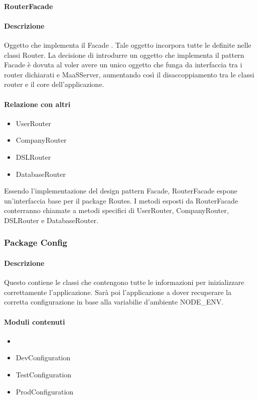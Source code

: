 \paragraph{RouterFacade}
\paragraph*{Descrizione}
Oggetto che implementa il Facade . Tale oggetto incorpora tutte le  definite nelle classi Router.
La decisione di introdurre un oggetto che implementa il pattern Facade è dovuta al voler avere un unico oggetto che funga da interfaccia tra i router dichiarati e MaaSServer, aumentando così il disaccoppiamento tra le classi router e il core dell'applicazione.  

\paragraph*{Relazione con altri }
\begin{itemize}
\item UserRouter
\item CompanyRouter
\item DSLRouter
\item DatabaseRouter
\end{itemize}
Essendo l'implementazione del design pattern Facade, RouterFacade espone un'interfaccia base per il package Routes. I metodi esposti da RouterFacade conterranno chiamate a metodi specifici di UserRouter, CompanyRouter, DSLRouter e DatabaseRouter.

\subsubsection{Package Config}
\paragraph*{Descrizione}
Questo  contiene le classi  che contengono tutte le informazioni per inizializzare correttamente l'applicazione. 
Sarà poi l'applicazione a dover recuperare la corretta configurazione in base alla variabilie d'ambiente NODE\_ENV.

\paragraph*{Moduli contenuti}
\begin{itemize}
\item {}
\item DevConfiguration
\item TestConfiguration
\item ProdConfiguration
\end{itemize}

